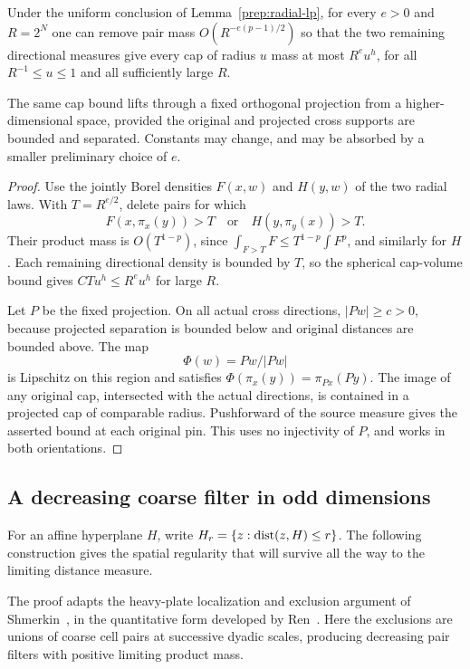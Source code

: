 \begin{lemma}\label{prep:integer-caps}
Under the uniform conclusion of Lemma~\ref{prep:radial-lp}, for
every $e>0$ and $R=2^N$ one can remove pair mass
$O(R^{-e(p-1)/2})$ so that the two remaining directional measures
give every cap of radius $u$ mass at most $R^eu^h$, for all
$R^{-1}\le u\le1$ and all sufficiently large $R$.

The same cap bound lifts through a fixed orthogonal projection from
a higher-dimensional space, provided the original and projected
cross supports are bounded and separated. Constants may change,
and may be absorbed by a smaller preliminary choice of $e$.
\end{lemma}
\begin{proof}
Use the jointly Borel densities $F(x,w)$ and $H(y,w)$ of the two
radial laws. With $T=R^{e/2}$, delete pairs for which
\[
 F(x,\pi_x(y))>T\quad\text{or}\quad H(y,\pi_y(x))>T.
\]
Their product mass is $O(T^{1-p})$, since
$\int_{F>T}F\le T^{1-p}\int F^p$, and similarly for $H$.
Each remaining directional density is bounded by $T$, so the
spherical cap-volume bound gives $CTu^h\le R^eu^h$ for large $R$.

Let $P$ be the fixed projection. On all actual cross directions,
$|Pw|\ge c>0$, because projected separation is bounded below and
original distances are bounded above. The map
\[
 \Phi(w)=Pw/|Pw|
\]
is Lipschitz on this region and satisfies
$\Phi(\pi_x(y))=\pi_{Px}(Py)$. The image of any original cap,
intersected with the actual directions, is contained in a projected
cap of comparable radius. Pushforward of the source measure gives
the asserted bound at each original pin. This uses no injectivity
of $P$, and works in both orientations.
\end{proof}

\subsection{A decreasing coarse filter in odd dimensions}

For an affine hyperplane $H$, write $H_r=\{z:\operatorname{dist}(z,H)\le r\}$.
The following construction gives the spatial regularity that will survive
all the way to the limiting distance measure.

The proof adapts the heavy-plate localization and exclusion argument of
Shmerkin~\cite[Appendix~B]{Shmerkin2023}, in the quantitative form
developed by Ren~\cite[Section~7]{Ren2023}. Here the exclusions are
unions of coarse cell pairs at successive dyadic scales, producing
decreasing pair filters with positive limiting product mass.

